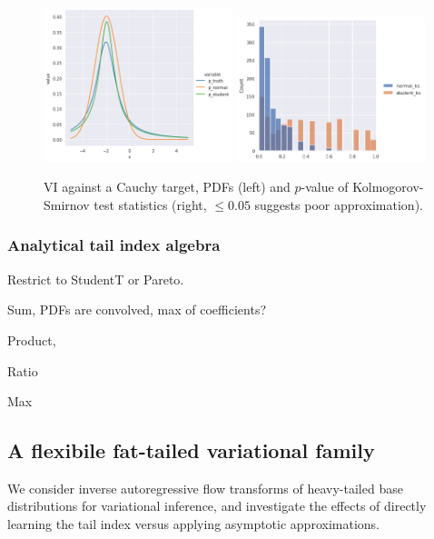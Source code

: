 \documentclass{scrartcl}
\theoremstyle{definition}
\begin{document}
\begin{figure}[H]
    \centering
    \includegraphics[width=0.49\textwidth]{Figures/cauchy_normal_student.png}
    \includegraphics[width=0.49\textwidth]{Figures/cauchy_ks.png}
    \caption{VI against a Cauchy target, PDFs (left) and $p$-value of Kolmogorov-Smirnov test statistics (right, $\leq 0.05$
        suggests poor approximation). 
    }
    \label{fig:cauchy_normal_student}
\end{figure}


\subsubsection{Analytical tail index algebra}

Restrict to StudentT or Pareto.

Sum, PDFs are convolved, max of coefficients?

Product, 

Ratio

Max


\subsection{A flexibile fat-tailed variational family}

We consider inverse autoregressive flow \cite{kingma2016improved} transforms
of heavy-tailed base distributions for variational inference, and investigate
the effects of directly learning the tail index versus applying asymptotic
approximations.
\end{document}
